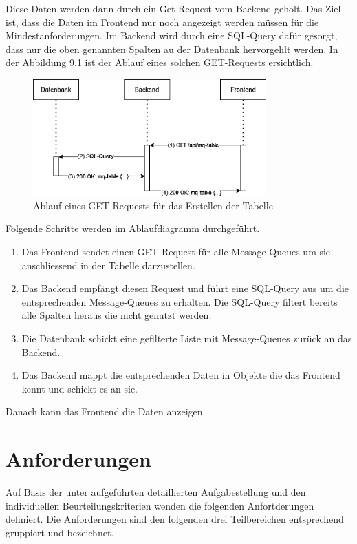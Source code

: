 \newpage
Diese Daten werden dann durch ein Get-Request vom Backend geholt. Das Ziel ist, dass die Daten im Frontend nur noch angezeigt werden müssen für die Mindestanforderungen. Im Backend wird durch eine SQL-Query dafür gesorgt, dass nur die oben genannten Spalten au der Datenbank hervorgehlt werden. In der Abbildung 9.1 ist der Ablauf eines solchen GET-Requests ersichtlich.

\begin{figure}[H]
	\begin{center}
		\includegraphics[width=0.8\textwidth]{ressourcen/Ablaufdiagramm}
		\caption[Ablauf eines GET-Requests für das Erstellen der Tabelle]{Ablauf eines GET-Requests für das Erstellen der Tabelle}\label{fig:get-request-for-creation-of-table}
	\end{center}
\end{figure}

Folgende Schritte werden im Ablaufdiagramm durchgeführt.
\begin{enumerate}
	\item Das Frontend sendet einen GET-Request für alle Message-Queues um sie anschliessend in der Tabelle darzustellen.
	\item Das Backend empfängt diesen Request und führt eine SQL-Query aus um die entsprechenden Message-Queues zu erhalten. Die SQL-Query filtert bereits alle Spalten heraus die nicht genutzt werden.
	\item Die Datenbank schickt eine gefilterte Liste mit Message-Queues zurück an das Backend.
	\item Das Backend mappt die entsprechenden Daten in Objekte die das Frontend kennt und schickt es an sie.
\end{enumerate}

Danach kann das Frontend die Daten anzeigen.
\newpage
\section{Anforderungen}
Auf Basis der unter  aufgeführten detaillierten Aufgabestellung und den individuellen Beurteilungskriterien wenden die folgenden Anfortderungen definiert. Die Anforderungen sind den folgenden drei Teilbereichen entsprechend gruppiert und bezeichnet.

